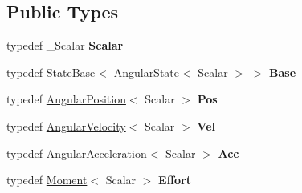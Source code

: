 \subsection*{Public Types}
\begin{DoxyCompactItemize}
\item 
typedef \+\_\+\+Scalar {\bfseries Scalar}\hypertarget{classow__core_1_1AngularState_a3a31d1e6f214742487857e742b899da9}{}\label{classow__core_1_1AngularState_a3a31d1e6f214742487857e742b899da9}

\item 
typedef \hyperlink{classow__core_1_1StateBase}{State\+Base}$<$ \hyperlink{classow__core_1_1AngularState}{Angular\+State}$<$ Scalar $>$ $>$ {\bfseries Base}\hypertarget{classow__core_1_1AngularState_ad0f5f4f623208bb19b9c5823deeb6bfa}{}\label{classow__core_1_1AngularState_ad0f5f4f623208bb19b9c5823deeb6bfa}

\item 
typedef \hyperlink{classow__core_1_1AngularPosition}{Angular\+Position}$<$ Scalar $>$ {\bfseries Pos}\hypertarget{classow__core_1_1AngularState_a7ae92e643cfe92c9d8e8bb2eff8eb5ca}{}\label{classow__core_1_1AngularState_a7ae92e643cfe92c9d8e8bb2eff8eb5ca}

\item 
typedef \hyperlink{classow__core_1_1AngularVelocity}{Angular\+Velocity}$<$ Scalar $>$ {\bfseries Vel}\hypertarget{classow__core_1_1AngularState_ada90ed9f2720eb9e16c9bd08bf61549d}{}\label{classow__core_1_1AngularState_ada90ed9f2720eb9e16c9bd08bf61549d}

\item 
typedef \hyperlink{classow__core_1_1AngularAcceleration}{Angular\+Acceleration}$<$ Scalar $>$ {\bfseries Acc}\hypertarget{classow__core_1_1AngularState_aef1183d0a59d05a9d2958d39e5534d31}{}\label{classow__core_1_1AngularState_aef1183d0a59d05a9d2958d39e5534d31}

\item 
typedef \hyperlink{classow__core_1_1Moment}{Moment}$<$ Scalar $>$ {\bfseries Effort}\hypertarget{classow__core_1_1AngularState_afe5d32cb74d1bae622c8c50103000e41}{}\label{classow__core_1_1AngularState_afe5d32cb74d1bae622c8c50103000e41}

\end{DoxyCompactItemize}
